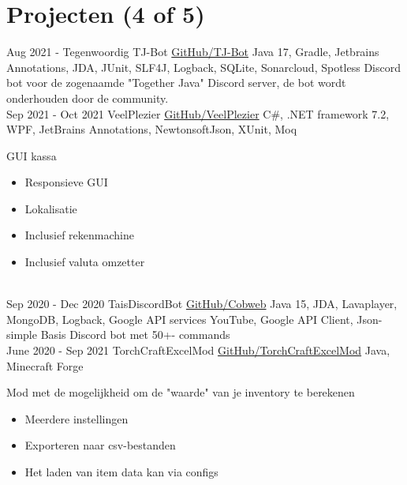 \documentclass[letterpaper]{twentysecondcv} %
\begin{document}
    \newpage

    \makesidebarSecond %



    \section{Projecten (4 of 5)}
    \begin{twenty} %
        \twentyitem
        {Aug 2021 -}
        {Tegenwoordig}
        {TJ-Bot}
        {\href{https://github.com/Together-Java/TJ-Bot/}{GitHub/TJ-Bot}}
        {Java 17, Gradle, Jetbrains Annotations, JDA, JUnit, SLF4J, Logback, SQLite, Sonarcloud, Spotless}
        {Discord bot voor de zogenaamde "Together Java" Discord server, de bot wordt onderhouden door de community.}\\
        \twentyitem
        {Sep 2021 -}
        {Oct 2021}
        {VeelPlezier}
        {\href{https://github.com/Tais993/VeelPlezier}{GitHub/VeelPlezier}}
        {C\#, .NET framework 7.2, WPF, JetBrains Annotations, NewtonsoftJson, XUnit, Moq}
        {
            GUI kassa
            \begin{itemize}
                \item Responsieve GUI
                \item Lokalisatie
                \item Inclusief rekenmachine
                \item Inclusief valuta omzetter
            \end{itemize}}\\
        \twentyitem
        {Sep 2020 -}
        {Dec 2020}
        {TaisDiscordBot}
        {\href{https://github.com/Tais993/taisdiscordbot}{GitHub/Cobweb}}
        {Java 15, JDA, Lavaplayer, MongoDB, Logback, Google API services YouTube, Google API Client, Json-simple}
        {Basis Discord bot met 50+- commands}\\
        \twentyitem
        {June 2020 -}
        {Sep 2021}
        {TorchCraftExcelMod}
        {\href{https://github.com/Tais993/TorchCraftExcelMod}{GitHub/TorchCraftExcelMod}}
        {Java, Minecraft Forge}
        {
            Mod met de mogelijkheid om de "waarde" van je inventory te berekenen
            \begin{itemize}
                \item Meerdere instellingen
                \item Exporteren naar csv-bestanden
                \item Het laden van item data kan via configs
            \end{itemize}}\\
    \end{twenty}
\end{document}
